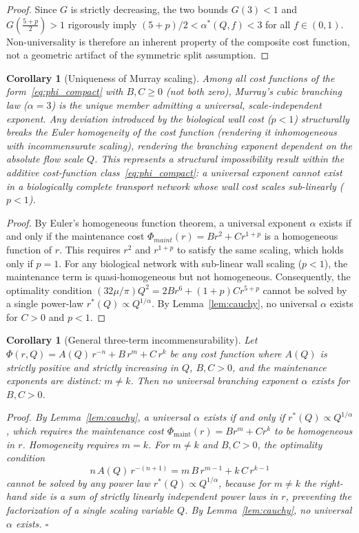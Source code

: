 \documentclass[11pt,a4paper]{article}
\newtheorem{corollary}[theorem]{Corollary}
\theoremstyle{remark}
\begin{document}
\begin{proof}
Since $G$ is strictly decreasing, the two bounds
$G(3)<1$ and $G\!\left(\tfrac{5+p}{2}\right)>1$ rigorously imply
$(5+p)/2 < \alpha^*(Q,f) < 3$ for all $f\in(0,1)$.
Non-universality is therefore an inherent property of the composite cost
function, not a geometric artifact of the symmetric split assumption.
\end{proof}

\begin{corollary}[Uniqueness of Murray scaling]
\label{cor:murray_uniqueness}
Among all cost functions of the form~\eqref{eq:phi_compact} with $B,C\geq0$ (not
both zero), Murray's cubic branching law ($\alpha=3$) is the unique member
admitting a universal, scale-independent exponent. Any deviation introduced by
the biological wall cost ($p<1$) structurally breaks the Euler homogeneity of
the cost function (rendering it inhomogeneous with incommensurate scaling),
rendering the branching exponent dependent on the absolute flow scale $Q$. This
represents a structural impossibility result \emph{within the
additive cost-function class~\eqref{eq:phi_compact}}: a universal
exponent cannot exist in a biologically complete transport network
whose wall cost scales sub-linearly ($p < 1$).
\end{corollary}

\begin{proof}
By Euler's homogeneous function theorem, a universal exponent $\alpha$ exists if
and only if the maintenance cost $\Phi_{maint}(r) = Br^2 + Cr^{1+p}$ is a
homogeneous function of $r$. This requires $r^2$ and $r^{1+p}$ to satisfy the
same scaling, which holds only if $p=1$. For any biological network with
sub-linear wall scaling ($p<1$), the maintenance term is quasi-homogeneous but
not homogeneous. Consequently, the optimality condition $(32\mu/\pi)Q^2 = 2Br^6
+ (1+p)Cr^{5+p}$ cannot be solved by a single power-law $r^*(Q) \propto
Q^{1/\alpha}$. By Lemma~\ref{lem:cauchy}, no universal $\alpha$ exists for $C>0$
and $p<1$.
\end{proof}

\begin{corollary}[General three-term incommensurability]
\label{cor:three_term_general}
Let $\Phi(r, Q) = A(Q)\,r^{-n} + B\,r^m + C\,r^k$ be any cost
function where $A(Q)$ is strictly positive and strictly increasing
in $Q$, $B, C > 0$, and the maintenance exponents are
\emph{distinct}: $m \neq k$. Then no universal branching exponent
$\alpha$ exists for $B, C > 0$.

\textit{Proof.}
By Lemma~\ref{lem:cauchy}, a universal $\alpha$ exists if and only
if $r^*(Q) \propto Q^{1/\alpha}$, which requires the maintenance
cost $\Phi_{\mathrm{maint}}(r) = Br^m + Cr^k$ to be homogeneous
in $r$. Homogeneity requires $m = k$. For $m \neq k$ and $B,C>0$,
the optimality condition
\[
  n\,A(Q)\,r^{-(n+1)} = m\,B\,r^{m-1} + k\,C\,r^{k-1}
\]
cannot be solved by any power law $r^*(Q) \propto Q^{1/\alpha}$,
because for $m \neq k$ the right-hand side is a sum of strictly
linearly independent power laws in $r$, preventing the
factorization of a single scaling variable $Q$.
By Lemma~\ref{lem:cauchy}, no universal $\alpha$ exists.
\hfill$\square$
\end{corollary}
\end{document}
